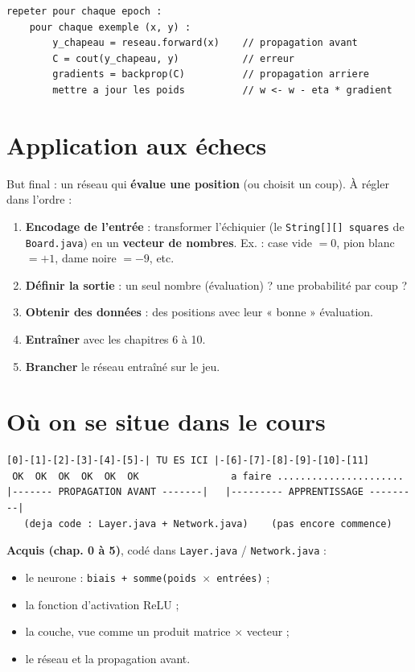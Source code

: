 \documentclass[11pt]{article}
\begin{document}
\begin{lstlisting}
repeter pour chaque epoch :
    pour chaque exemple (x, y) :
        y_chapeau = reseau.forward(x)    // propagation avant
        C = cout(y_chapeau, y)           // erreur
        gradients = backprop(C)          // propagation arriere
        mettre a jour les poids          // w <- w - eta * gradient
\end{lstlisting}

\section{Application aux échecs}

But final : un réseau qui \textbf{évalue une position} (ou choisit un coup). À
régler dans l'ordre :
\begin{enumerate}[leftmargin=2em]
  \item \textbf{Encodage de l'entrée} : transformer l'échiquier (le
  \texttt{String[][] squares} de \texttt{Board.java}) en un \textbf{vecteur de
  nombres}. Ex. : case vide $=0$, pion blanc $=+1$, dame noire $=-9$, etc.
  \item \textbf{Définir la sortie} : un seul nombre (évaluation) ? une probabilité
  par coup ?
  \item \textbf{Obtenir des données} : des positions avec leur « bonne » évaluation.
  \item \textbf{Entraîner} avec les chapitres 6 à 10.
  \item \textbf{Brancher} le réseau entraîné sur le jeu.
\end{enumerate}

\section*{Où on se situe dans le cours}

\begin{lstlisting}
[0]-[1]-[2]-[3]-[4]-[5]-| TU ES ICI |-[6]-[7]-[8]-[9]-[10]-[11]
 OK  OK  OK  OK  OK  OK                a faire ......................
|------- PROPAGATION AVANT -------|   |--------- APPRENTISSAGE ---------|
   (deja code : Layer.java + Network.java)    (pas encore commence)
\end{lstlisting}

\textbf{Acquis (chap. 0 à 5)}, codé dans \texttt{Layer.java} / \texttt{Network.java} :
\begin{itemize}[leftmargin=2em]
  \item le neurone : \texttt{biais + somme(poids $\times$ entrées)} ;
  \item la fonction d'activation ReLU ;
  \item la couche, vue comme un produit matrice $\times$ vecteur ;
  \item le réseau et la propagation avant.
\end{itemize}
\end{document}
